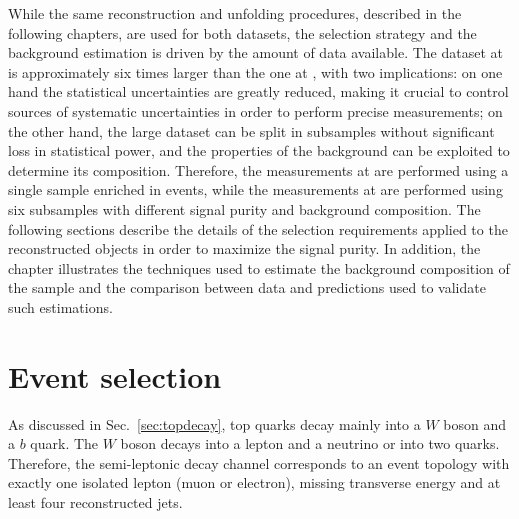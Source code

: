 While the same reconstruction and unfolding procedures, described in
the following chapters, are used for both datasets, the selection
strategy and the background estimation is driven by the amount of data
available. 
The dataset at \eighttev{} is approximately six times larger than the
one at \seventev{}, with two implications: on one hand the statistical
uncertainties are greatly reduced, making it crucial to control
sources of systematic uncertainties in order to perform precise
measurements; on the other hand, the large dataset can be split in
subsamples without significant loss in statistical power, and the
properties of the background can be exploited to determine
its composition. Therefore, the measurements at \seventev{} are
performed using a single sample enriched in \ttbar{} events, while the
measurements at \eighttev{} are performed using six subsamples with
different signal purity and background composition. The following sections
describe the details of the selection requirements applied to the
reconstructed objects in order to maximize the \ttbar{} signal
purity. 
In addition, the chapter illustrates the techniques used to estimate
the background composition of the sample and the comparison between
data and predictions used to validate such estimations.

\section{Event selection}
\label{sec:evtsel}

As discussed in Sec.~\ref{sec:topdecay}, top quarks
decay mainly into a $W$ boson and a $b$ quark. The $W$ boson decays
into a lepton and a neutrino or into two quarks. Therefore, the
semi-leptonic decay channel corresponds to an event topology with
exactly one isolated lepton (muon or electron), missing transverse
energy and at least four reconstructed jets.

